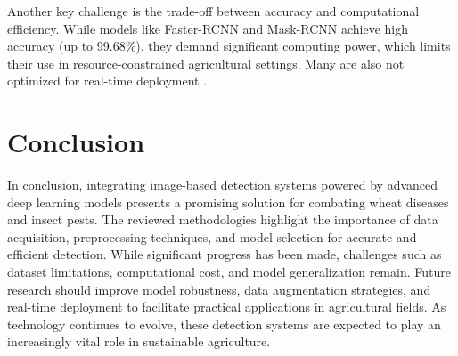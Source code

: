 Another key challenge is the trade-off between accuracy and computational efficiency. While models like Faster-RCNN and Mask-RCNN achieve high accuracy (up to 99.68\%), they demand significant computing power, which limits their use in resource-constrained agricultural settings. Many are also not optimized for real-time deployment \parencite{li2022recommending}.

\section{Conclusion}
In conclusion, integrating image-based detection systems powered by advanced deep learning models presents a promising solution for combating wheat diseases and insect pests. The reviewed methodologies highlight the importance of data acquisition, preprocessing techniques, and model selection for accurate and efficient detection. While significant progress has been made, challenges such as dataset limitations, computational cost, and model generalization remain. Future research should improve model robustness, data augmentation strategies, and real-time deployment to facilitate practical applications in agricultural fields. As technology continues to evolve, these detection systems are expected to play an increasingly vital role in sustainable agriculture.